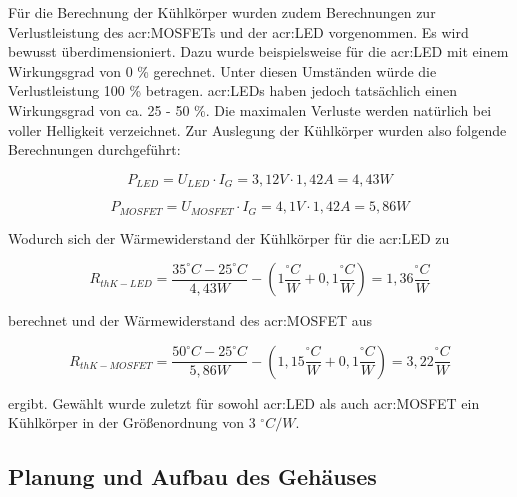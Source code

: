 Für die Berechnung der Kühlkörper wurden zudem Berechnungen zur Verlustleistung des
\gls{acr:MOSFET}s und der \gls{acr:LED} vorgenommen. Es wird bewusst überdimensioniert. Dazu wurde beispielsweise für die \gls{acr:LED} mit einem Wirkungsgrad von 0 \% gerechnet. Unter diesen Umständen würde die Verlustleistung 100 \% betragen. \gls{acr:LED}s haben jedoch tatsächlich einen Wirkungsgrad von ca. 25 - 50 \%. Die maximalen Verluste werden natürlich bei voller Helligkeit verzeichnet. Zur Auslegung der Kühlkörper wurden also folgende Berechnungen durchgeführt:

\begin{equation}
	\label{equ:thermoled}
	P_{LED} = U_{LED} \cdot I_{G} = 3,12V \cdot 1,42A= 4,43W
\end{equation}

\begin{equation}
	\label{equ:thermomos}
	P_{MOSFET} = U_{MOSFET} \cdot I_{G} = 4,1V \cdot 1,42A= 5,86W
\end{equation}

Wodurch sich der Wärmewiderstand der Kühlkörper für die \gls{acr:LED} zu

\begin{equation}
	\label{equ:thermo2}
	R_{thK-LED} = \frac{35 ^\circ C - 25 ^\circ C}{4,43W}-(1 \frac{^\circ C}{W}+0,1 \frac{^\circ C}{W}) = 1,36\frac{^\circ C}{W}
\end{equation}

berechnet und der Wärmewiderstand des \gls{acr:MOSFET} aus
 
\begin{equation}
	\label{equ:thermo3}
	R_{thK-MOSFET} = \frac{50 ^\circ C - 25 ^\circ C}{5,86W}-(1,15 \frac{^\circ C}{W}+0,1 \frac{^\circ C}{W}) = 3,22\frac{^\circ C}{W}
\end{equation}

ergibt. Gewählt wurde zuletzt für sowohl \gls{acr:LED} als auch \gls{acr:MOSFET} ein Kühlkörper in der Größenordnung von 3 $^\circ C/W$.

\subsection{Planung und Aufbau des Gehäuses}
\label{subsec:geh}

